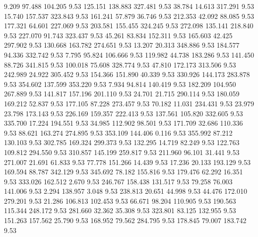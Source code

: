    9.209   97.488  104.205         9.53
 125.151  138.883  327.481         9.53
  38.784   14.613  317.291         9.53
  15.740  157.537  323.843         9.53
 161.241   57.879   36.746         9.53
 212.353   42.092   88.085         9.53
 177.321   64.601  227.069         9.53
 203.581  155.455  324.245         9.53
 272.098  135.141  218.840         9.53
 227.070   91.743  323.437         9.53
  45.261   83.834  152.311         9.53
 165.603   42.425  297.902         9.53
 130.668  163.782  274.651         9.53
  13.207   20.313  348.886         9.53
 184.577   94.336  332.742         9.53
   7.795   95.824  106.666         9.53
 119.982   44.738  183.286         9.53
 141.450   88.726  341.815         9.53
 100.018   75.608  328.774         9.53
  47.810  172.173  313.506         9.53
 242.989   24.922  305.452         9.53
 154.366  151.890   40.339         9.53
 330.926  144.173  283.878         9.53
 354.602  137.599  353.220         9.53
   7.934   94.814  140.419         9.53
 182.209  104.950  267.889         9.53
 141.817  157.196  201.110         9.53
  24.701   21.715  290.114         9.53
 180.059  169.212   52.837         9.53
 177.105   87.228  273.457         9.53
  70.182   11.031  234.431         9.53
  23.979   23.798  173.143         9.53
 226.169  159.357  222.413         9.53
 137.561  105.820  332.605         9.53
 335.700   17.224  194.551         9.53
  34.985  112.902   98.501         9.53
 171.709   32.686  110.336         9.53
  88.621  163.274  274.895         9.53
 353.109  144.406    0.116         9.53
 355.992   87.212  130.103         9.53
 302.785  169.324  299.373         9.53
 132.295   14.719   82.249         9.53
 122.763  109.812  294.550         9.53
 310.857  145.199  259.817         9.53
 211.960   96.101   31.441         9.53
 271.007   21.691   61.833         9.53
  77.778  151.266   14.439         9.53
  17.236   20.133  193.129         9.53
 169.594   88.787  342.129         9.53
 345.692   78.182  155.816         9.53
 179.476   62.292   16.351         9.53
 333.026  162.512    2.670         9.53
 246.767  158.438  131.517         9.53
  79.258   76.003  141.006         9.53
   2.294  138.957    3.048         9.53
 238.813   20.651   44.998         9.53
  44.476  172.010  279.201         9.53
  21.286  106.813  102.453         9.53
  66.671   98.204  110.905         9.53
 190.563  115.344  248.172         9.53
 281.660   32.362   35.308         9.53
 323.801   83.125  132.955         9.53
 151.263  157.562   25.790         9.53
 168.952   79.562  284.795         9.53
 178.845   79.007  183.742         9.53
